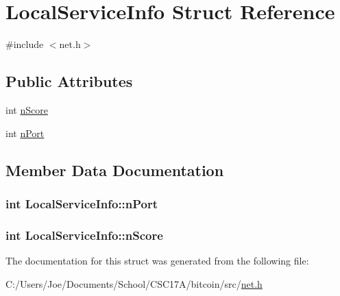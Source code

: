 \hypertarget{struct_local_service_info}{}\section{Local\+Service\+Info Struct Reference}
\label{struct_local_service_info}


{\ttfamily \#include $<$net.\+h$>$}

\subsection*{Public Attributes}
\begin{DoxyCompactItemize}
\item 
int \hyperlink{struct_local_service_info_ad6a9d404fb109ba1506df3f6ca842ed5}{n\+Score}
\item 
int \hyperlink{struct_local_service_info_aa5c39fec8cc69a43e393bb158f69224b}{n\+Port}
\end{DoxyCompactItemize}


\subsection{Member Data Documentation}
\hypertarget{struct_local_service_info_aa5c39fec8cc69a43e393bb158f69224b}{}
\subsubsection[{n\+Port}]{\setlength{\rightskip}{0pt plus 5cm}int Local\+Service\+Info\+::n\+Port}\label{struct_local_service_info_aa5c39fec8cc69a43e393bb158f69224b}
\hypertarget{struct_local_service_info_ad6a9d404fb109ba1506df3f6ca842ed5}{}
\subsubsection[{n\+Score}]{\setlength{\rightskip}{0pt plus 5cm}int Local\+Service\+Info\+::n\+Score}\label{struct_local_service_info_ad6a9d404fb109ba1506df3f6ca842ed5}


The documentation for this struct was generated from the following file\+:\begin{DoxyCompactItemize}
\item 
C\+:/\+Users/\+Joe/\+Documents/\+School/\+C\+S\+C17\+A/bitcoin/src/\hyperlink{net_8h}{net.\+h}\end{DoxyCompactItemize}

